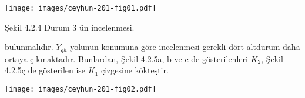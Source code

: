 \documentclass[12pt]{article}
\begin{document}

	\texttt{[image: images/ceyhun-201-fig01.pdf]}

Şekil 4.2.4 Durum 3 ün incelenmesi.

bulunmalıdır. $Y_{gh}$ yolunun konumuna göre incelenmesi gerekli dört altdurum daha ortaya çıkmaktadır. Bunlardan, Şekil 4.2.5a, b ve c de gösterilenleri $K_{2}$, Şekil 4.2.5ç de gösterilen ise $K_{1}$ çizgesine kökteştir.

	\texttt{[image: images/ceyhun-201-fig02.pdf]}
\end{document}
